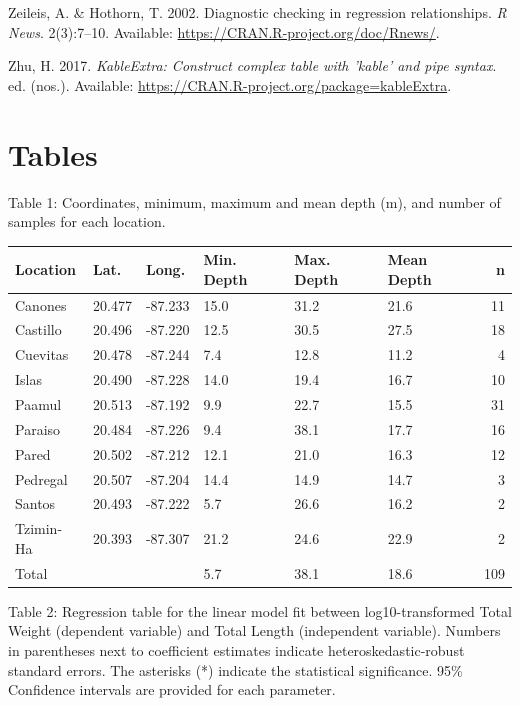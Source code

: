 \documentclass[12pt,]{article}
\begin{document}
\hypertarget{ref-lmtest_2002}{}
Zeileis, A. \& Hothorn, T. 2002. Diagnostic checking in regression
relationships. \emph{R News}. 2(3):7--10. Available:
\url{https://CRAN.R-project.org/doc/Rnews/}.

\hypertarget{ref-kableExtra_2017}{}
Zhu, H. 2017. \emph{KableExtra: Construct complex table with 'kable' and
pipe syntax}. ed. (nos.). Available:
\url{https://CRAN.R-project.org/package=kableExtra}.

\clearpage

\clearpage

\section{Tables}\label{tables}

Table 1: Coordinates, minimum, maximum and mean depth (m), and number of
samples for each location.

\begin{tabular}{llllllr}
\toprule
Location & Lat. & Long. & Min. Depth & Max. Depth & Mean Depth & n\\
\midrule
Canones & 20.477 & -87.233 & 15.0 & 31.2 & 21.6 & 11\\
Castillo & 20.496 & -87.220 & 12.5 & 30.5 & 27.5 & 18\\
Cuevitas & 20.478 & -87.244 & 7.4 & 12.8 & 11.2 & 4\\
Islas & 20.490 & -87.228 & 14.0 & 19.4 & 16.7 & 10\\
Paamul & 20.513 & -87.192 & 9.9 & 22.7 & 15.5 & 31\\
\addlinespace
Paraiso & 20.484 & -87.226 & 9.4 & 38.1 & 17.7 & 16\\
Pared & 20.502 & -87.212 & 12.1 & 21.0 & 16.3 & 12\\
Pedregal & 20.507 & -87.204 & 14.4 & 14.9 & 14.7 & 3\\
Santos & 20.493 & -87.222 & 5.7 & 26.6 & 16.2 & 2\\
Tzimin-Ha & 20.393 & -87.307 & 21.2 & 24.6 & 22.9 & 2\\
Total &  &  & 5.7 & 38.1 & 18.6 & 109\\
\bottomrule
\end{tabular}

\clearpage

Table 2: Regression table for the linear model fit between
log10-transformed Total Weight (dependent variable) and Total Length
(independent variable). Numbers in parentheses next to coefficient
estimates indicate heteroskedastic-robust standard errors. The asterisks
(*) indicate the statistical significance. 95\% Confidence intervals are
provided for each parameter.
\end{document}
